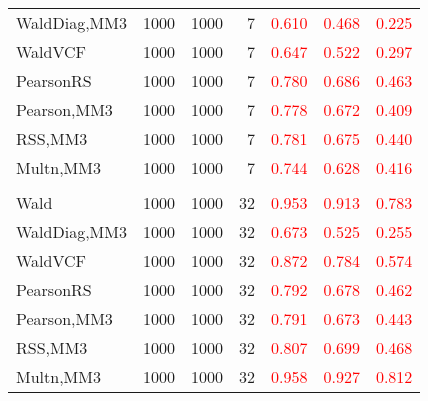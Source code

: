 \documentclass[
]{article}
\begin{document}
\begin{table}[H]
{\begin{tabular}[t]{lrrrrrr}
\hspace{1em}WaldDiag,MM3 & 1000 & 1000 & 7 & \textcolor{red}{0.610} & \textcolor{red}{0.468} & \textcolor{red}{0.225}\\
\hspace{1em}WaldVCF & 1000 & 1000 & 7 & \textcolor{red}{0.647} & \textcolor{red}{0.522} & \textcolor{red}{0.297}\\
\hspace{1em}PearsonRS & 1000 & 1000 & 7 & \textcolor{red}{0.780} & \textcolor{red}{0.686} & \textcolor{red}{0.463}\\
\hspace{1em}Pearson,MM3 & 1000 & 1000 & 7 & \textcolor{red}{0.778} & \textcolor{red}{0.672} & \textcolor{red}{0.409}\\
\hspace{1em}RSS,MM3 & 1000 & 1000 & 7 & \textcolor{red}{0.781} & \textcolor{red}{0.675} & \textcolor{red}{0.440}\\
\hspace{1em}Multn,MM3 & 1000 & 1000 & 7 & \textcolor{red}{0.744} & \textcolor{red}{0.628} & \textcolor{red}{0.416}\\
\addlinespace[0.3em]
\multicolumn{7}{l}{\textbf{3F 15V}}\\
\hspace{1em}Wald & 1000 & 1000 & 32 & \textcolor{red}{0.953} & \textcolor{red}{0.913} & \textcolor{red}{0.783}\\
\hspace{1em}WaldDiag,MM3 & 1000 & 1000 & 32 & \textcolor{red}{0.673} & \textcolor{red}{0.525} & \textcolor{red}{0.255}\\
\hspace{1em}WaldVCF & 1000 & 1000 & 32 & \textcolor{red}{0.872} & \textcolor{red}{0.784} & \textcolor{red}{0.574}\\
\hspace{1em}PearsonRS & 1000 & 1000 & 32 & \textcolor{red}{0.792} & \textcolor{red}{0.678} & \textcolor{red}{0.462}\\
\hspace{1em}Pearson,MM3 & 1000 & 1000 & 32 & \textcolor{red}{0.791} & \textcolor{red}{0.673} & \textcolor{red}{0.443}\\
\hspace{1em}RSS,MM3 & 1000 & 1000 & 32 & \textcolor{red}{0.807} & \textcolor{red}{0.699} & \textcolor{red}{0.468}\\
\hspace{1em}Multn,MM3 & 1000 & 1000 & 32 & \textcolor{red}{0.958} & \textcolor{red}{0.927} & \textcolor{red}{0.812}\\
\bottomrule
\end{tabular}}
\endgroup{}
\end{table}
\end{document}
